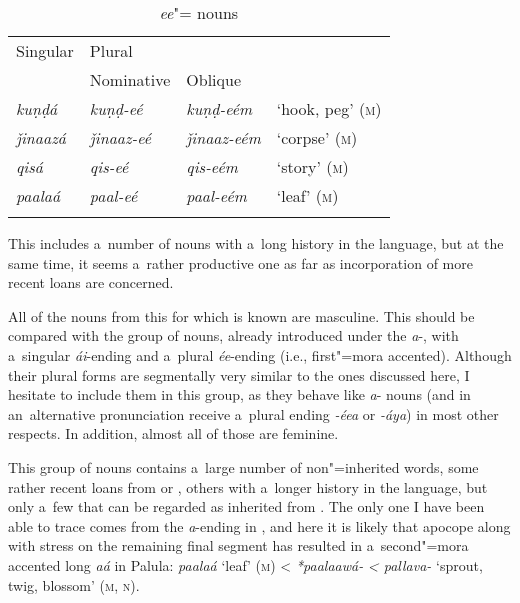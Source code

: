 \begin{table}[ht]
 \label{bkm:Ref193698864}
 \caption{\textit{ee}"= nouns}
\begin{tabularx}{\textwidth}{ Q Q Q Q }
\lsptoprule
Singular
&
Plural\\
&
Nominative &
Oblique &
\\\hline
\textit{kuṇḍá} &
\textit{kuṇḍ-eé} &
\textit{kuṇḍ-eém} &
`hook, peg' (\textsc{m})\\
\textit{ǰinaazá} &
\textit{ǰinaaz-eé} &
\textit{ǰinaaz-eém} &
`corpse' (\textsc{m})\\
\textit{qisá} &
\textit{qis-eé} &
\textit{qis-eém} &
`story' (\textsc{m})\\
\textit{paalaá} &
\textit{paal-eé} &
\textit{paal-eém} &
`leaf' (\textsc{m})\\\lspbottomrule
\end{tabularx}
\label{tab:4-18}
\end{table}

This  includes a~number of nouns with a~long history in the language, but at the same time, it seems a~rather productive one as far as incorporation of more recent loans are concerned.


All of the nouns from this  for which  is known are masculine. This should be compared with the group of nouns, already introduced under the \textit{a}-, with a~singular \textit{ái}-ending and a~plural \textit{ée}-ending (i.e., first"=mora accented). Although their plural forms are segmentally very similar to the ones discussed here, I hesitate to include them in this group, as they behave like \textit{a}- nouns (and in an~alternative pronunciation receive a~plural ending \textit{-éea} or \textit{-áya}) in most other respects. In addition, almost all of those are feminine.


This group of nouns contains a~large number of non"=inherited words, some rather recent loans from  or , others with a~longer history in the language, but only a~few that can be regarded as inherited from . The only one I have been able to trace comes from the \textit{a}-ending  in , and here it is likely that apocope along with stress on the remaining final segment has resulted in a~second"=mora accented long \textit{aá} in Palula: \textit{paalaá} `leaf' (\textsc{m}) {\textless} \textit{*paalaawá-} \textit{{\textless} pallava-} `sprout, twig, blossom' (\textsc{m}, \textsc{n}).


